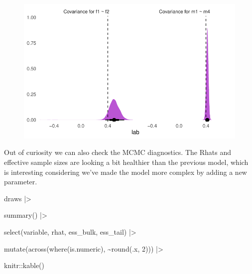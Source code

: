 \documentclass[
  letterpaper,
  DIV=11,
  numbers=noendperiod]{scrreprt}
\newenvironment{Shaded}{\begin{snugshade}}{\end{snugshade}}
\newcommand{\DecValTok}[1]{\textcolor[rgb]{0.68,0.00,0.00}{#1}}
\newcommand{\FunctionTok}[1]{\textcolor[rgb]{0.28,0.35,0.67}{#1}}
\newcommand{\NormalTok}[1]{\textcolor[rgb]{0.00,0.23,0.31}{#1}}
\newcommand{\SpecialCharTok}[1]{\textcolor[rgb]{0.37,0.37,0.37}{#1}}
\begin{document}
\begin{figure}[H]

{\centering \includegraphics{./bayesian-cfa_files/figure-pdf/viz-draws-mtmm-covar-1.pdf}

}

\end{figure}

Out of curiosity we can also check the MCMC diagnostics. The Rhats and
effective sample sizes are looking a bit healthier than the previous
model, which is interesting considering we've made the model more
complex by adding a new parameter.

\begin{Shaded}
\begin{Highlighting}[]
\NormalTok{draws }\SpecialCharTok{|\textgreater{}}

  \FunctionTok{summary}\NormalTok{() }\SpecialCharTok{|\textgreater{}}

  \FunctionTok{select}\NormalTok{(variable, rhat, ess\_bulk, ess\_tail) }\SpecialCharTok{|\textgreater{}}

  \FunctionTok{mutate}\NormalTok{(}\FunctionTok{across}\NormalTok{(}\FunctionTok{where}\NormalTok{(is.numeric), }\SpecialCharTok{\textasciitilde{}}\FunctionTok{round}\NormalTok{(.x, }\DecValTok{2}\NormalTok{))) }\SpecialCharTok{|\textgreater{}}

\NormalTok{  knitr}\SpecialCharTok{::}\FunctionTok{kable}\NormalTok{()}
\end{Highlighting}
\end{Shaded}
\end{document}
